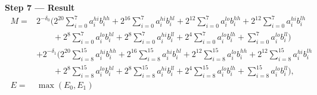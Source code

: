 \documentclass[fleqn]{article}
\begin{document}
\textbf{Step 7 --- Result}
\[
\boxed{\;
\begin{aligned}
M ={}& 2^{-\delta_0}\Big(2^{20}\!\sum_{i=0}^{7} a_i^{hi} b_i^{hh} + 2^{16}\!\sum_{i=0}^{7} a_i^{hi} b_i^{hl} + 2^{12}\!\sum_{i=0}^{7} a_i^{lo} b_i^{hh} + 2^{12}\!\sum_{i=0}^{7} a_i^{hi} b_i^{lh} \\
  &\qquad + 2^{8}\!\sum_{i=0}^{7} a_i^{lo} b_i^{hl} + 2^{8}\!\sum_{i=0}^{7} a_i^{hi} b_i^{ll} + 2^{4}\!\sum_{i=0}^{7} a_i^{lo} b_i^{lh} + \sum_{i=0}^{7} a_i^{lo} b_i^{ll}\Big) \\
  & + 2^{-\delta_1}\Big(2^{20}\!\sum_{i=8}^{15} a_i^{hi} b_i^{hh} + 2^{16}\!\sum_{i=8}^{15} a_i^{hi} b_i^{hl} + 2^{12}\!\sum_{i=8}^{15} a_i^{lo} b_i^{hh} + 2^{12}\!\sum_{i=8}^{15} a_i^{hi} b_i^{lh} \\
  &\qquad + 2^{8}\!\sum_{i=8}^{15} a_i^{lo} b_i^{hl} + 2^{8}\!\sum_{i=8}^{15} a_i^{hi} b_i^{ll} + 2^{4}\!\sum_{i=8}^{15} a_i^{lo} b_i^{lh} + \sum_{i=8}^{15} a_i^{lo} b_i^{ll}\Big), \\[0.3em]
E ={}& \max(E_0,E_1)
\end{aligned}
\;}
\]
\end{document}

